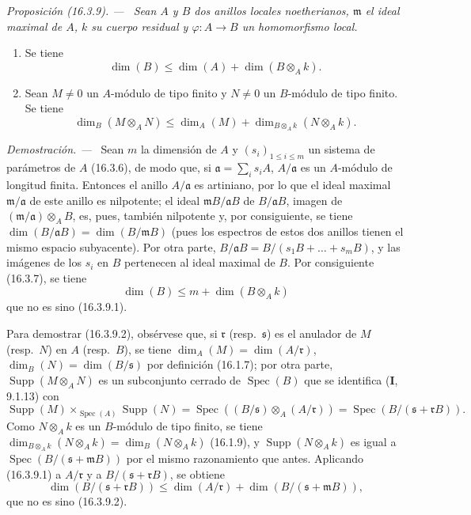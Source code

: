 \documentclass[10pt,oneside]{book}
\makeatletter
\newcommand{\setmanualcurrentlabel}[1]{\def\@currentlabel{#1}}
\newcommand{\oldpage}[2][]{%
  \setcounter{footnote}{0}%
  \marginpar{\scriptsize\textbf{#1}~|~#2}\ignorespaces}
\newenvironment{proposition}[1][]{%
  \setmanualcurrentlabel{#1}\par\medskip\noindent\itshape Proposición (#1). ---\ }{\par}
\newenvironment{proof}{%
  \par\medskip\noindent\textit{Demostración. ---\ }}{\par}
\makeatother
\begin{document}
\begin{proposition}[16.3.9]
\label{0.16.3.9-es}
Sean $A$ y $B$ dos anillos locales noetherianos, $\mathfrak{m}$ el ideal
maximal de $A$, $k$ su cuerpo residual y $\varphi:A\to B$ un homomorfismo
local.
\begin{enumerate}
  \item[\rm{(i)}] Se tiene
  \begin{equation}
  \label{0.16.3.9.1-es}
  \tag{16.3.9.1}
    \dim(B)\leq\dim(A)+\dim(B\otimes_A k).
  \end{equation}
  \item[\rm{(ii)}] Sean $M\neq0$ un $A$-módulo de tipo finito y $N\neq0$ un
  $B$-módulo de tipo finito. Se tiene
  \begin{equation}
  \label{0.16.3.9.2-es}
  \tag{16.3.9.2}
    \dim_B(M\otimes_A N)
    \leq\dim_A(M)+\dim_{B\otimes_A k}(N\otimes_A k).
  \end{equation}
\end{enumerate}
\end{proposition}

\begin{proof}
Sean $m$ la dimensión de $A$ y $(s_i)_{1\leq i\leq m}$ un sistema de
parámetros de $A$ (16.3.6), de modo que, si
$\mathfrak{a}=\sum_i s_iA$, $A/\mathfrak{a}$ es un $A$-módulo de longitud
finita. Entonces el anillo $A/\mathfrak{a}$ es artiniano, por lo que el ideal
maximal $\mathfrak{m}/\mathfrak{a}$ de este anillo es nilpotente; el ideal
$\mathfrak{m}B/\mathfrak{a}B$ de $B/\mathfrak{a}B$, imagen de
$(\mathfrak{m}/\mathfrak{a})\otimes_A B$, es, pues, también nilpotente y, por
consiguiente, se tiene
$\dim(B/\mathfrak{a}B)=\dim(B/\mathfrak{m}B)$ (pues los espectros de estos dos
anillos tienen el mismo espacio subyacente). Por otra parte,
$B/\mathfrak{a}B=B/(s_1B+\ldots+s_mB)$, y las imágenes de los $s_i$ en $B$
pertenecen al ideal maximal de $B$. Por consiguiente (16.3.7), se tiene
\[
  \dim(B)\leq m+\dim(B\otimes_A k)
\]
que no es sino (16.3.9.1).

Para demostrar (16.3.9.2), obsérvese que, si $\mathfrak{r}$
(resp.~$\mathfrak{s}$) es el anulador de $M$ (resp.~$N$)
\oldpage[0\textsubscript{IV-1}]{32}
en $A$ (resp.~$B$), se tiene
$\dim_A(M)=\dim(A/\mathfrak{r})$, $\dim_B(N)=\dim(B/\mathfrak{s})$ por
definición (16.1.7); por otra parte, $\operatorname{Supp}(M\otimes_A N)$ es un
subconjunto cerrado de $\operatorname{Spec}(B)$ que se identifica (\textbf I, 9.1.13)
con
\[
  \operatorname{Supp}(M)\times_{\operatorname{Spec}(A)}\operatorname{Supp}(N)
  =\operatorname{Spec}((B/\mathfrak{s})\otimes_A(A/\mathfrak{r}))
  =\operatorname{Spec}(B/(\mathfrak{s}+\mathfrak{r}B)).
\]
Como $N\otimes_A k$ es un $B$-módulo de tipo finito, se tiene
$\dim_{B\otimes_A k}(N\otimes_A k)=\dim_B(N\otimes_A k)$ (16.1.9), y
$\operatorname{Supp}(N\otimes_A k)$ es igual a
$\operatorname{Spec}(B/(\mathfrak{s}+\mathfrak{m}B))$ por el mismo
razonamiento que antes. Aplicando (16.3.9.1) a $A/\mathfrak{r}$ y a
$B/(\mathfrak{s}+\mathfrak{r}B)$, se obtiene
\[
  \dim(B/(\mathfrak{s}+\mathfrak{r}B))
  \leq\dim(A/\mathfrak{r})+
  \dim(B/(\mathfrak{s}+\mathfrak{m}B)),
\]
que no es sino (16.3.9.2).
\end{proof}
\end{document}
